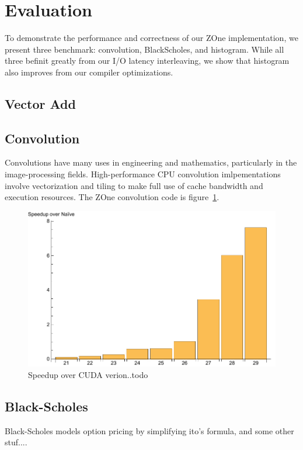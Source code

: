 \section{Evaluation}

To demonstrate the performance and correctness of our ZOne implementation, we
present three benchmark: convolution, BlackScholes, and histogram.
While all three befinit greatly from our I/O latency interleaving, we show
	that histogram also improves from our compiler optimizations.


\subsection{Vector Add}

\subsection{Convolution}
Convolutions have many uses in engineering and mathematics, particularly in
the image-processing fields. High-performance CPU convolution imlpementations
involve vectorization and tiling to make full use of cache bandwidth and 
execution resources. The ZOne convolution code is figure~\ref{fig:stencil}.

\begin{figure}
\centering
\includegraphics[scale=0.5]{data/stencil.pdf}
\caption{Speedup over CUDA verion..todo}
\label{fig:stencil}
\centering
\end{figure}

\subsection{Black-Scholes}
Black-Scholes models option pricing by simplifying ito's formula, and some other stuf....



